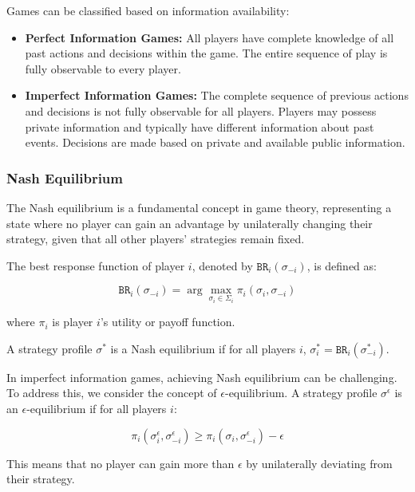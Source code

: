 \documentclass[11pt]{article}
\begin{document}
Games can be classified based on information availability:

\begin{itemize}
  \item \textbf{Perfect Information Games:} All players have complete knowledge of all past actions and decisions within the game. The entire sequence of play is fully observable to every player.
  
  \item \textbf{Imperfect Information Games:} The complete sequence of previous actions and decisions is not fully observable for all players. Players may possess private information and typically have different information about past events. Decisions are made based on private and available public information.
\end{itemize}

\subsubsection{Nash Equilibrium}

The Nash equilibrium is a fundamental concept in game theory, representing a state where no player can gain an advantage by unilaterally changing their strategy, given that all other players' strategies remain fixed.

The best response function of player $i$, denoted by $\texttt{BR}_i(\sigma_{-i})$, is defined as:

\begin{equation}
\texttt{BR}_i(\sigma_{-i}) = \arg\max_{\sigma_i \in \Sigma_i} \pi_i(\sigma_i,\sigma_{-i})
\end{equation}

where $\pi_i$ is player $i$'s utility or payoff function.

A strategy profile $\sigma^*$ is a Nash equilibrium if for all players $i$, $\sigma_i^* = \texttt{BR}_i(\sigma_{-i}^*)$.

In imperfect information games, achieving Nash equilibrium can be challenging. To address this, we consider the concept of $\epsilon$-equilibrium. A strategy profile $\sigma^\epsilon$ is an $\epsilon$-equilibrium if for all players $i$:

\begin{equation}
\pi_i(\sigma^\epsilon_i,\sigma^\epsilon_{-i}) \geq \pi_i(\sigma_i, \sigma^\epsilon_{-i}) - \epsilon
\end{equation}

This means that no player can gain more than $\epsilon$ by unilaterally deviating from their strategy.
\end{document}

